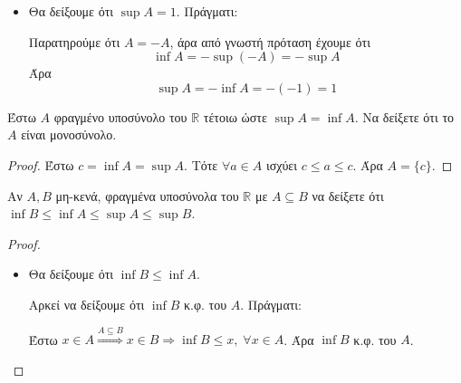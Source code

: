 \begin{multicols}{2}
\begin{enumerate}
\begin{enumerate}[i)]
\begin{itemize}
                    $ -1 $ κ.φ. του $A$, γιατί $ \frac{1}{n} - \frac{1}{m} \geq \frac{1}{n} 
                    - 1 > -1, \; \forall n \in \mathbb{N} $.

                    ΄
                    Εστω $ \varepsilon > 0 $. Τότε, $ \exists n_{0} \in \mathbb{N} $ με 
                    $ \frac{1}{n_{0} -1} < \varepsilon -1 - -1 + \varepsilon   $ με 
                    $ \frac{1}{n_{0} - 1} \in A $.

                \item Θα δείξουμε ότι $ \sup A = 1 $. Πράγματι:

                    Παρατηρούμε ότι $ A = -A $, άρα από γνωστή πρόταση έχουμε ότι 
                    \[ \inf A = - \sup (-A) = - \sup A \]
                    Άρα \[ \sup A = - \inf A = -(-1) = 1 \]
            \end{itemize}

            \end{enumerate}

        \pagebreak

        \item \textcolor{Col1}{Έστω $A$ φραγμένο υποσύνολο του $ \mathbb{R} $ τέτοιω ώστε $ \sup A = \inf A $.
            Να δείξετε ότι το $A$ είναι μονοσύνολο.}

            \begin{proof}
            \item {}
                Έστω $ c = \inf A = \sup A $. Τότε $ \forall a \in A $ ισχύει $ c \leq a \leq c
                $. Άρα $ A = \{ c \} $.
            \end{proof}

        \item \textcolor{Col1}{Αν $ A, B $ μη-κενά, φραγμένα υποσύνολα του $ \mathbb{R} $ με $ A \subseteq B $ να δείξετε ότι $ \inf B \leq \inf A \leq \sup A \leq \sup B $.}

            \begin{proof}
            \item {} 
                \begin{itemize}
                    \item Θα δείξουμε ότι $ \inf B \leq \inf A $. 

                        Αρκεί να δείξουμε ότι $ \inf B $ κ.φ. του $A$. Πράγματι:

                        Έστω $ x \in A \overset{A \subseteq B}{\Rightarrow} x \in B \Rightarrow 
                        \inf B \leq x, \; \forall x \in A $. Άρα $ \inf B $ κ.φ. του $A$.


\end{itemize}
\end{proof}
\end{enumerate}
\end{multicols}
